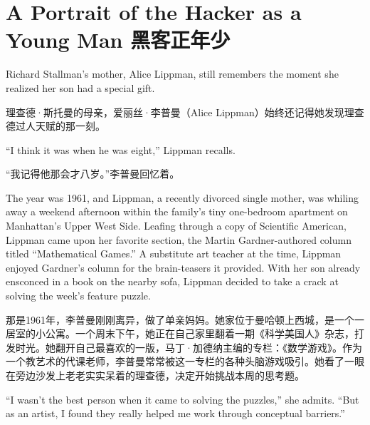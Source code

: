 
\chapter{\ifdefined\eng
A Portrait of the Hacker as a Young Man
\fi
\ifdefined\chs
黑客正年少
\fi}
\fi

\ifdefined\eng
Richard Stallman's mother, Alice Lippman, still remembers the moment she realized her son had a special gift.
\fi

\ifdefined\chs
理查德·斯托曼的母亲，爱丽丝·李普曼（Alice Lippman）始终还记得她发现理查德过人天赋的那一刻。
\fi

\ifdefined\eng
``I think it was when he was eight,'' Lippman recalls.
\fi

\ifdefined\chs
“我记得他那会才八岁。”李普曼回忆着。
\fi

\ifdefined\eng
The year was 1961, and Lippman, a recently divorced single mother, was whiling away a weekend afternoon within the family's tiny one-bedroom apartment on Manhattan's Upper West Side. Leafing through a copy of Scientific American, Lippman came upon her favorite section, the Martin Gardner-authored column titled ``Mathematical Games.'' A substitute art teacher at the time, Lippman enjoyed Gardner's column for the brain-teasers it provided. With her son already ensconced in a book on the nearby sofa, Lippman decided to take a crack at solving the week's feature puzzle.
\fi

\ifdefined\chs
那是1961年，李普曼刚刚离异，做了单亲妈妈。她家位于曼哈顿上西城，是一个一居室的小公寓。一个周末下午，她正在自己家里翻着一期《科学美国人》杂志，打发时光。她翻开自己最喜欢的一版，马丁·加德纳主编的专栏：《数学游戏》。作为一个教艺术的代课老师，李普曼常常被这一专栏的各种头脑游戏吸引。她看了一眼在旁边沙发上老老实实呆着的理查德，决定开始挑战本周的思考题。
\fi

\ifdefined\eng
``I wasn't the best person when it came to solving the puzzles,'' she admits. ``But as an artist, I found they really helped me work through conceptual barriers.''
\fi

